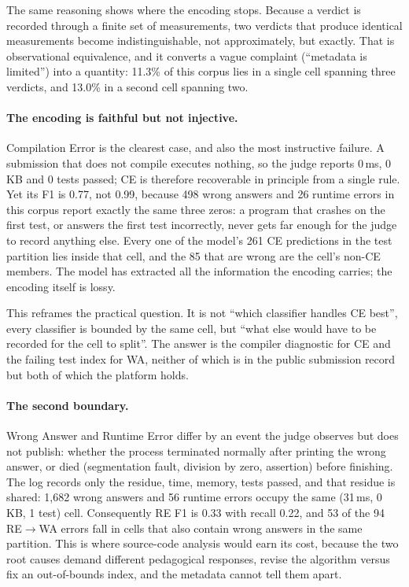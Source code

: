 \documentclass[acmsmall]{acmart}
\begin{document}
The same reasoning shows where the encoding stops. Because a verdict is recorded
through a finite set of measurements, two verdicts that produce identical
measurements become indistinguishable, not approximately, but exactly. That is
observational equivalence, and it converts a vague complaint (``metadata is
limited'') into a quantity: 11.3\% of this corpus lies in a single cell
spanning three verdicts, and 13.0\% in a second cell spanning two.

\paragraph{The encoding is faithful but not injective.} Compilation Error is the
clearest case, and also the most instructive failure. A submission that does not
compile executes nothing, so the judge reports 0\,ms, 0\,KB and 0 tests passed;
CE is therefore recoverable in principle from a single rule. Yet its F1 is 0.77,
not 0.99, because 498 wrong answers and 26 runtime errors in this corpus report
exactly the same three zeros: a program that crashes on the first test, or
answers the first test incorrectly, never gets far enough for the judge to
record anything else. Every one of the model's 261 CE predictions in the test
partition lies inside that cell, and the 85 that are wrong are the cell's
non-CE members. The model has extracted all the information the encoding
carries; the encoding itself is lossy.

This reframes the practical question. It is not ``which classifier handles CE
best'', every classifier is bounded by the same cell, but ``what else would
have to be recorded for the cell to split''. The answer is the compiler
diagnostic for CE and the failing test index for WA, neither of which is in the
public submission record but both of which the platform holds.

\paragraph{The second boundary.} Wrong Answer and Runtime Error differ by an
event the judge observes but does not publish: whether the process terminated
normally after printing the wrong answer, or died (segmentation fault, division
by zero, assertion) before finishing. The log records only the residue, time,
 memory, tests passed, and that residue is shared: 1,682 wrong answers and 56
runtime errors occupy the same (31\,ms, 0\,KB, 1 test) cell. Consequently RE F1
is 0.33 with recall 0.22, and 53 of the 94 RE$\rightarrow$WA errors fall in
cells that also contain wrong answers in the same partition. This is where
source-code analysis would earn its cost, because the two root causes demand
different pedagogical responses, revise the algorithm versus fix an
out-of-bounds index, and the metadata cannot tell them apart.
\end{document}
